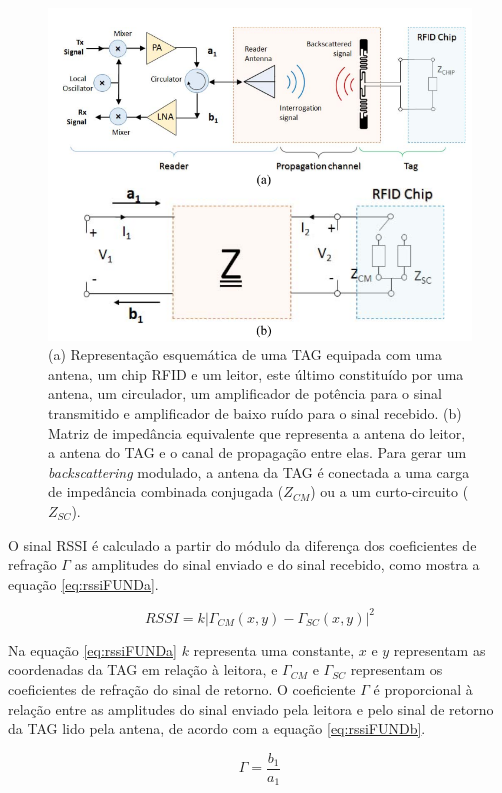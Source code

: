 \begin{figure}[H]
    \centering
    \includegraphics[width=0.8\linewidth]{figs/Fundamentos/rssi.PNG}
    \caption{(a) Representação esquemática de uma TAG equipada com uma antena, um chip RFID e um leitor, este último constituído por uma antena, um circulador, um amplificador de potência para o sinal transmitido e amplificador de baixo ruído para o sinal recebido. (b) Matriz de impedância equivalente que representa a antena do leitor, a antena do TAG e o canal de propagação entre elas. Para gerar um \textit{backscattering} modulado, a antena da TAG é conectada a uma carga de impedância combinada conjugada ($Z_{CM}$) ou a um curto-circuito ($Z_{SC}$). \cite{buffi2018rssi}}
    \label{fig:rssiFUND}
\end{figure}

O sinal RSSI é calculado a partir do módulo da diferença dos coeficientes de refração $\Gamma$ as amplitudes do sinal enviado e do sinal recebido, como mostra a equação \ref{eq:rssiFUNDa}. 

\begin{equation}
    RSSI = k {|\Gamma_{CM}(x,y) - \Gamma_{SC}(x,y)|}^2
    \label{eq:rssiFUNDa}
\end{equation}

Na equação \ref{eq:rssiFUNDa} $k$ representa uma constante, $x$ e $y$ representam as coordenadas da TAG em relação à leitora, e $\Gamma_{CM}$ e $\Gamma_{SC}$ representam os coeficientes de refração do sinal de retorno. O coeficiente $\Gamma$ é proporcional à relação entre as amplitudes do sinal enviado pela leitora e pelo sinal de retorno da TAG lido pela antena, de acordo com a equação \ref{eq:rssiFUNDb}.

\begin{equation}
    \Gamma = \frac{b_1}{a_1}
    \label{eq:rssiFUNDb}
\end{equation}

